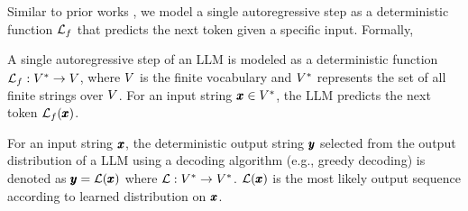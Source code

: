 Similar to prior works \cite{tc0, expressivity1}, we model a single autoregressive step as a deterministic function $\mathcal{L}_{f}$ that predicts the next token given a specific input. 
Formally,
\begin{definition}
A single autoregressive step of an LLM is modeled as a deterministic function $\mathcal{L}_{f} : V^{*} \to V$, where $V$ is the finite vocabulary and $V^{*}$ represents the set of all finite strings over $V$. For an input string $\pmb{x} \in V^{*}$, the LLM predicts the next token $\mathcal{L}_{f}(\pmb{x})$.
\end{definition}
\begin{definition}
For an input string $\pmb{x}$, the deterministic output string $\pmb{y}$ selected from the output distribution of a LLM using a decoding algorithm (e.g., greedy decoding) is denoted as $\pmb{y} = \mathcal{L}{}(\pmb{x})$ where $\mathcal{L}: V^{*} \to V^*$. $\mathcal{L}(\pmb{x})$ is the most likely output sequence according to learned distribution on $\pmb{x}$.
\end{definition}


